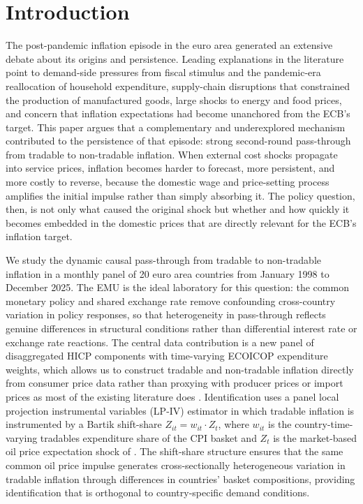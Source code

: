 \section{Introduction}

The post-pandemic inflation episode in the euro area generated an extensive debate about
its origins and persistence.
Leading explanations in the literature point to demand-side pressures from fiscal stimulus
and the pandemic-era reallocation of household expenditure, supply-chain disruptions that
constrained the production of manufactured goods, large shocks to energy and food prices,
and concern that inflation expectations had become unanchored from the ECB's target.
This paper argues that a complementary and underexplored mechanism contributed to the
persistence of that episode: strong second-round pass-through from tradable to non-tradable
inflation.
When external cost shocks propagate into service prices, inflation becomes harder to
forecast, more persistent, and more costly to reverse, because the domestic wage and
price-setting process amplifies the initial impulse rather than simply absorbing it.
The policy question, then, is not only what caused the original shock but whether and how
quickly it becomes embedded in the domestic prices that are directly relevant for the
ECB's inflation target.

We study the dynamic causal pass-through from tradable to non-tradable inflation in a
monthly panel of 20 euro area countries from January 1998 to December 2025.
The EMU is the ideal laboratory for this question: the common monetary policy and shared
exchange rate remove confounding cross-country variation in policy responses, so that
heterogeneity in pass-through reflects genuine differences in structural conditions rather
than differential interest rate or exchange rate reactions.
The central data contribution is a new panel of disaggregated HICP components with
time-varying ECOICOP expenditure weights, which allows us to construct tradable and
non-tradable inflation directly from consumer price data rather than proxying with producer
prices or import prices as most of the existing literature does
\citep[see, e.g.,][]{ha2023}.
Identification uses a panel local projection instrumental variables (LP-IV) estimator in
which tradable inflation is instrumented by a Bartik shift-share
$Z_{it} = w_{it}\cdot Z_t$, where $w_{it}$ is the country-time-varying tradables
expenditure share of the CPI basket and $Z_t$ is the market-based oil price expectation
shock of \citet{baumeister2019}.
The shift-share structure ensures that the same common oil price impulse generates
cross-sectionally heterogeneous variation in tradable inflation through differences in
countries' basket compositions, providing identification that is orthogonal to
country-specific demand conditions.

